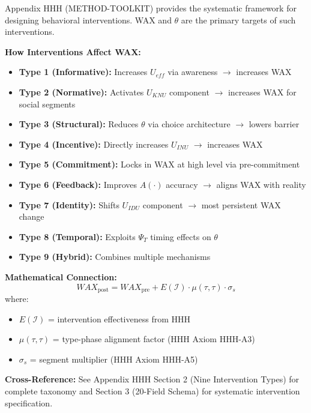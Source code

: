 \begin{tcolorbox}[colback=orange!5!white, colframe=orange!75!black,
    title=\textbf{HHH Integration: Intervention Design Toolkit}]

Appendix HHH (METHOD-TOOLKIT) provides the systematic framework for designing
behavioral interventions. WAX and $\theta$ are the primary targets of such interventions.

\textbf{How Interventions Affect WAX:}
\begin{itemize}[nosep]
    \item \textbf{Type 1 (Informative):} Increases $U_{eff}$ via awareness $\to$ increases WAX
    \item \textbf{Type 2 (Normative):} Activates $U_{KNU}$ component $\to$ increases WAX for social segments
    \item \textbf{Type 3 (Structural):} Reduces $\theta$ via choice architecture $\to$ lowers barrier
    \item \textbf{Type 4 (Incentive):} Directly increases $U_{INU}$ $\to$ increases WAX
    \item \textbf{Type 5 (Commitment):} Locks in WAX at high level via pre-commitment
    \item \textbf{Type 6 (Feedback):} Improves $A(\cdot)$ accuracy $\to$ aligns WAX with reality
    \item \textbf{Type 7 (Identity):} Shifts $U_{IDU}$ component $\to$ most persistent WAX change
    \item \textbf{Type 8 (Temporal):} Exploits $\Psi_T$ timing effects on $\theta$
    \item \textbf{Type 9 (Hybrid):} Combines multiple mechanisms
\end{itemize}

\textbf{Mathematical Connection:}
\begin{equation}
WAX_{\text{post}} = WAX_{\text{pre}} + E(\mathcal{I}) \cdot \mu(\tau, \tau) \cdot \sigma_s
\label{eq:av-hhh-wax-change}
\end{equation}
where:
\begin{itemize}[nosep]
    \item $E(\mathcal{I})$ = intervention effectiveness from HHH
    \item $\mu(\tau, \tau)$ = type-phase alignment factor (HHH Axiom HHH-A3)
    \item $\sigma_s$ = segment multiplier (HHH Axiom HHH-A5)
\end{itemize}

\textbf{Cross-Reference:} See Appendix HHH Section 2 (Nine Intervention Types) for complete taxonomy
and Section 3 (20-Field Schema) for systematic intervention specification.

\end{tcolorbox}

